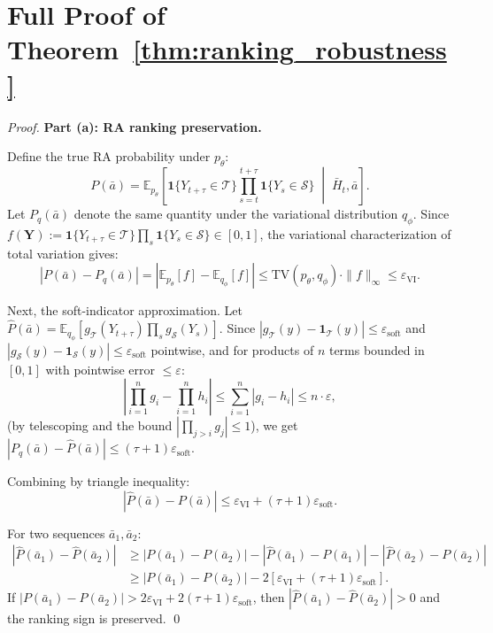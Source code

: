 \documentclass{article}
\newcommand{\E}{\mathbb{E}}
\newcommand{\TV}{\mathrm{TV}}
\newcommand{\bH}{\bar{H}}
\newcommand{\ba}{\bar{a}}
\newcommand{\cT}{\mathcal{T}}
\newcommand{\cS}{\mathcal{S}}
\newcommand{\ind}{\mathbf{1}}
\begin{document}
\appendix

\section{Full Proof of Theorem~\ref{thm:ranking_robustness}}
\label{app:proofs}

\begin{proof}

\textbf{Part (a): RA ranking preservation.}

Define the true RA probability under $p_\theta$:
\[
P(\ba) = \E_{p_\theta}\!\left[\ind\{Y_{t+\tau} \in \cT\} \prod_{s=t}^{t+\tau} \ind\{Y_s \in \cS\} \;\middle|\; \bH_t, \ba\right].
\]
Let $P_{q}(\ba)$ denote the same quantity under the variational distribution $q_\phi$. Since $f(\mathbf{Y}) := \ind\{Y_{t+\tau} \in \cT\} \prod_s \ind\{Y_s \in \cS\} \in [0, 1]$, the variational characterization of total variation gives:
\[
|P(\ba) - P_q(\ba)| = |\E_{p_\theta}[f] - \E_{q_\phi}[f]| \leq \TV(p_\theta, q_\phi) \cdot \|f\|_\infty \leq \varepsilon_{\mathrm{VI}}.
\]

Next, the soft-indicator approximation. Let $\hat{P}(\ba) = \E_{q_\phi}[g_\cT(Y_{t+\tau}) \prod_s g_\cS(Y_s)]$. Since $|g_\cT(y) - \ind_\cT(y)| \leq \varepsilon_{\mathrm{soft}}$ and $|g_\cS(y) - \ind_\cS(y)| \leq \varepsilon_{\mathrm{soft}}$ pointwise, and for products of $n$ terms bounded in $[0,1]$ with pointwise error $\leq \varepsilon$:
\[
\left|\prod_{i=1}^{n} g_i - \prod_{i=1}^{n} h_i\right| \leq \sum_{i=1}^{n} |g_i - h_i| \leq n \cdot \varepsilon,
\]
(by telescoping and the bound $|\prod_{j>i} g_j| \leq 1$), we get $|P_q(\ba) - \hat{P}(\ba)| \leq (\tau + 1) \varepsilon_{\mathrm{soft}}$.

Combining by triangle inequality:
\[
|\hat{P}(\ba) - P(\ba)| \leq \varepsilon_{\mathrm{VI}} + (\tau + 1)\varepsilon_{\mathrm{soft}}.
\]

For two sequences $\ba_1, \ba_2$:
\begin{align}
|\hat{P}(\ba_1) - \hat{P}(\ba_2)| &\geq |P(\ba_1) - P(\ba_2)| - |\hat{P}(\ba_1) - P(\ba_1)| - |\hat{P}(\ba_2) - P(\ba_2)| \\
&\geq |P(\ba_1) - P(\ba_2)| - 2[\varepsilon_{\mathrm{VI}} + (\tau+1)\varepsilon_{\mathrm{soft}}].
\end{align}
If $|P(\ba_1) - P(\ba_2)| > 2\varepsilon_{\mathrm{VI}} + 2(\tau+1)\varepsilon_{\mathrm{soft}}$, then $|\hat{P}(\ba_1) - \hat{P}(\ba_2)| > 0$ and the ranking sign is preserved. \qed


\end{proof}
\end{document}
